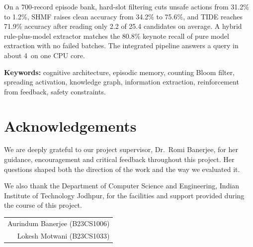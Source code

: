 \documentclass[12pt,a4paper,oneside]{report}
\newcommand{\ms}{\,\text{ms}}
\begin{document}
On a 700-record episode bank, hard-slot filtering cuts unsafe actions from 31.2\% to 1.2\%, SHMF raises clean accuracy from 34.2\% to 75.6\%, and TIDE reaches 71.9\% accuracy after reading only 2.2 of 25.4 candidates on average. A hybrid rule-plus-model extractor matches the 80.8\% keynote recall of pure model extraction with no failed batches. The integrated pipeline answers a query in about 4\ms{} on one CPU core.

\vspace{0.5em}
\noindent\textbf{Keywords:} cognitive architecture, episodic memory, counting Bloom filter, spreading activation, knowledge graph, information extraction, reinforcement from feedback, safety constraints.

\clearpage
\chapter*{Acknowledgements}
We are deeply grateful to our project supervisor, Dr.\ Romi Banerjee, for her guidance, encouragement and critical feedback throughout this project. Her questions shaped both the direction of the work and the way we evaluated it.

We also thank the Department of Computer Science and Engineering, Indian Institute of Technology Jodhpur, for the facilities and support provided during the course of this project.

\vspace{1.5cm}
\hfill\begin{tabular}{r}
Aurindum Banerjee (B23CS1006)\\
Lokesh Motwani (B23CS1033)
\end{tabular}

\clearpage
\tableofcontents
\clearpage

\clearpage
{}
\makeatletter
\renewcommand\chapter{\par\addvspace{1.6\baselineskip}\thispagestyle{fancy}\global\@topnum\z@\@afterindentfalse\secdef\@chapter\@schapter}
\makeatother
\titlespacing*{\chapter}{0pt}{0pt}{14pt}

\end{document}
